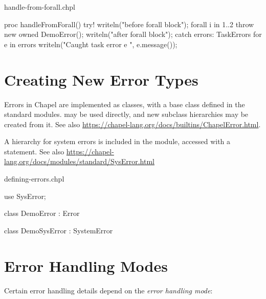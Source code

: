 \begin{chapelexample}{handle-from-forall.chpl}
\begin{chapel}
proc handleFromForall() {
  try! {
    writeln("before forall block");
    forall i in 1..2 {
      throw new owned DemoError();
    }
    writeln("after forall block");
  } catch errors: TaskErrors {
    for e in errors {
      writeln("Caught task error e ", e.message());
    }
  }
}
\end{chapel}
\begin{chapelpost}
\end{chapelpost}
\begin{chapeloutput}
\end{chapeloutput}
\end{chapelexample}


\section{Creating New Error Types}
\label{Creating_New_Error_Types}

Errors in Chapel are implemented as classes, with a base class 
defined in the standard modules.  may be used directly, and new
subclass hierarchies may be created from it.  See also
\url{https://chapel-lang.org/docs/builtins/ChapelError.html}.

A hierarchy for system errors is included in the  module,
accessed with a  statement.  See also
\url{https://chapel-lang.org/docs/modules/standard/SysError.html}

\begin{chapelexample}{defining-errors.chpl}
\begin{chapel}
use SysError;

class DemoError : Error { }

class DemoSysError : SystemError { }
\end{chapel}
\begin{chapelpost}
\end{chapelpost}
\begin{chapeloutput}
\end{chapeloutput}
\end{chapelexample}


\section{Error Handling Modes}
\label{Error_Handling_Modes}

Certain error handling details depend on the \emph{error handling mode}:

